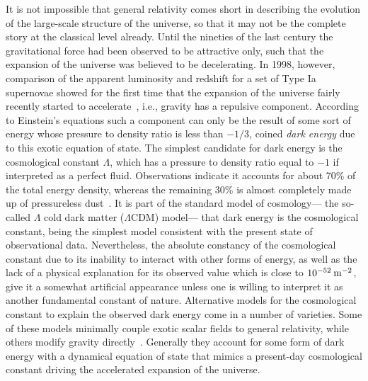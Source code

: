 \documentclass[
final,
11pt,
a4paper,
DIV=11,
headinclude=true,
footinclude=false,
bibliography=totoc,
twoside=true,  %
BCOR=5mm
]{scrbook}
\begin{document}
It is not impossible that general relativity comes short in 
describing the evolution of the large-scale structure of the 
universe, so that it may not be the complete story at the 
classical level already. Until the nineties of the last century 
the gravitational force had been observed to be attractive only, 
such that the expansion of the universe was believed to be 
decelerating. In 1998, however, comparison of the apparent 
luminosity and redshift for a set of Type Ia supernovae showed 
for the first time that the expansion of the universe fairly 
recently started to accelerate~\cite{Perlmutter:1998np, 
  Riess:1998cb}, i.e., gravity has a repulsive component.  
According to Einstein's equations such a component can only be 
the result of some sort of energy whose pressure to density ratio 
is less than $-1/3$, coined \emph{dark energy} due to this exotic 
equation of state.  The simplest candidate for dark energy is the 
cosmological constant $\Lambda$, which has a pressure to density 
ratio equal to $-1$ if interpreted as a perfect fluid.  
Observations indicate it accounts for about 70\% of the total 
energy density, whereas the remaining 30\% is almost completely 
made up of pressureless dust~\cite{Ade:2015xua}. It is part of 
the standard model of cosmology--- the so-called $\Lambda$ cold 
dark matter ($\Lambda$CDM) model--- that dark energy is the 
cosmological constant, being the simplest model consistent with 
the present state of observational data.  Nevertheless, the 
absolute constancy of the cosmological constant due to its 
inability to interact with other forms of energy, as well as the 
lack of a physical explanation for its observed value which is 
close to $10^{-52}\:\mathrm{m}^{-2}$, give it a somewhat artificial 
appearance unless one is willing to interpret it as another 
fundamental constant of nature.  Alternative models for the 
cosmological constant to explain the observed dark energy come in 
a number of varieties. Some of these models minimally couple 
exotic scalar fields to general relativity, while others modify 
gravity directly~\cite{Copeland:2006wr}.  Generally they account 
for some form of dark energy with a dynamical equation of state 
that mimics a present-day cosmological constant driving the 
accelerated expansion of the universe.
\end{document}
